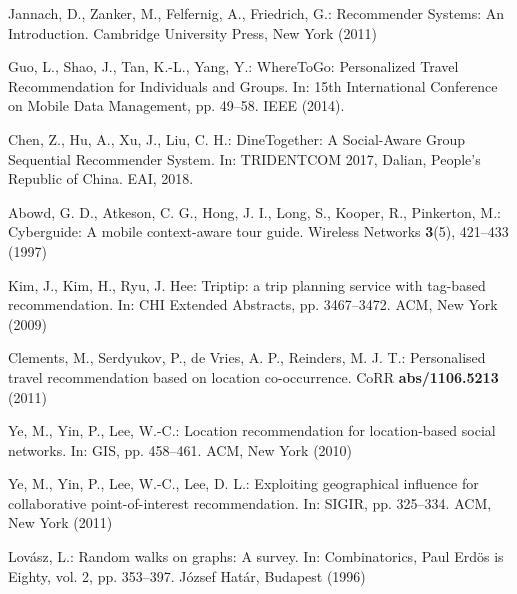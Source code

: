 \documentclass[runningheads]{llncs}
\begin{document}
\begin{thebibliography}{8}

Jannach, D., Zanker, M., Felfernig, A., Friedrich, G.: Recommender Systems: An Introduction. Cambridge University Press, New York (2011)

Guo, L., Shao, J., Tan, K.-L., Yang, Y.: WhereToGo: Personalized Travel Recommendation for Individuals and Groups. In: 15th International Conference on Mobile Data Management, pp. 49--58. IEEE (2014). 

Chen, Z., Hu, A., Xu, J., Liu, C. H.: DineTogether: A Social-Aware Group Sequential Recommender System. In: TRIDENTCOM 2017, Dalian, People's Republic of China. EAI, 2018. 

Abowd, G. D., Atkeson, C. G., Hong, J. I., Long, S., Kooper, R., Pinkerton, M.: Cyberguide: A mobile context-aware tour guide. Wireless Networks \textbf{3}(5), 421--433 (1997)

Kim, J., Kim, H., Ryu, J. Hee: Triptip: a trip planning service with tag-based recommendation. In: CHI Extended Abstracts, pp. 3467--3472. ACM, New York (2009)

Clements, M., Serdyukov, P., de Vries, A. P., Reinders, M. J. T.: Personalised travel recommendation based on location co-occurrence. CoRR \textbf{abs/1106.5213} (2011)

Ye, M., Yin, P., Lee, W.-C.: Location recommendation for location-based social networks. In: GIS, pp. 458--461. ACM, New York (2010)

Ye, M., Yin, P., Lee, W.-C., Lee, D. L.: Exploiting geographical influence for collaborative point-of-interest recommendation. In: SIGIR, pp. 325--334. ACM, New York (2011)

Lovász, L.: Random walks on graphs: A survey. In: Combinatorics, Paul Erdös is Eighty, vol. 2, pp. 353--397. József Határ, Budapest (1996)

\end{thebibliography}
\end{document}
